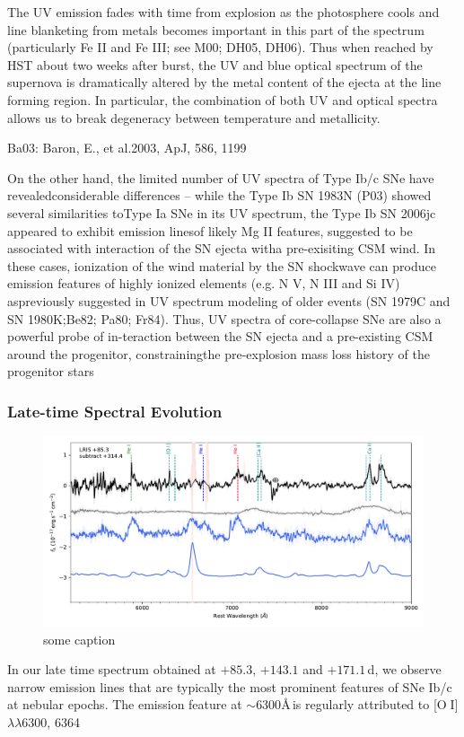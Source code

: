 \documentclass[twocolumn]{aastex63}
\def\ion#1#2{#1$\;${\footnotesize\rm{#2}}\relax}
\begin{document}
\begin{CJK*}{UTF8}{gbsn}
The UV emission fades with time from explosion as the photosphere cools and line blanketing from 
metals becomes important in this part of the spectrum (particularly Fe II and Fe III; see M00; DH05, 
DH06). Thus when reached by HST about two weeks after burst, the UV and blue optical spectrum of 
the supernova is dramatically altered by the metal content of the ejecta at the line forming region.   In 
particular, the combination of both UV and optical spectra allows us to break degeneracy between 
temperature and metallicity. 

Ba03:  Baron, E., et al.2003, ApJ, 586, 1199

 On the other hand, the limited number of UV spectra of Type Ib/c SNe have revealedconsiderable 
 differences – while the Type Ib SN 1983N (P03) showed several similarities toType Ia SNe in its UV 
 spectrum, the Type Ib SN 2006jc appeared to exhibit emission linesof likely Mg II features, suggested 
 to be associated with interaction of the SN ejecta witha pre-exisiting CSM wind.  In these cases, 
 ionization of the wind material by the SN shockwave can produce emission features of highly ionized 
 elements (e.g.  N V, N III and Si IV) aspreviously suggested in UV spectrum modeling of older events 
 (SN 1979C and SN 1980K;Be82; Pa80; Fr84).  Thus, UV spectra of core-collapse SNe are also a 
 powerful probe of in-teraction between the SN ejecta and a pre-existing CSM around the progenitor, 
 constrainingthe pre-explosion mass loss history of the progenitor stars

\subsubsection{Late-time  Spectral Evolution}
\begin{figure}
		\centering
	\includegraphics[width=\textwidth]{figures/spec_host_subtracted.pdf}
		\caption{some caption}
\end{figure}
In our late time spectrum obtained at $+85.3$, $+143.1$ and $+171.1$\,d, we observe narrow emission 
lines that are typically the most prominent features of SNe Ib/c at nebular epochs. The emission feature 
at $\sim6300$\AA\,is regularly attributed to [\ion{O}{I}] $\lambda\lambda$6300, 6364 
\citep{Maedo2008}


\end{CJK*}
\end{document}
